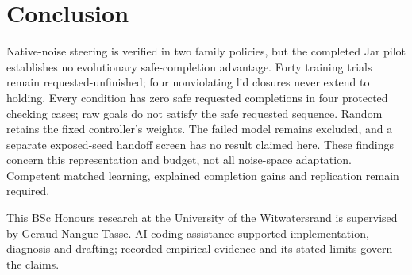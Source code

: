 \documentclass[sigconf,dvipsnames,balance=false]{acmart}
\begin{document}
\section{Conclusion}
Native-noise steering is verified in two family policies, but the completed
Jar pilot establishes no evolutionary safe-completion advantage. Forty training
trials remain requested-unfinished; four nonviolating lid closures never extend
to holding. Every condition has zero safe requested completions in four protected
checking cases; raw goals do not satisfy the safe requested sequence. Random
retains the fixed controller's weights. The failed model remains excluded, and
a separate exposed-seed handoff screen has no result claimed here. These findings
concern this representation and budget, not all noise-space adaptation. Competent
matched learning, explained completion gains and replication remain required.

\begin{acks}
This BSc Honours research at the University of the Witwatersrand is supervised by
Geraud Nangue Tasse. AI coding assistance supported implementation, diagnosis and
drafting; recorded empirical evidence and its stated limits govern the claims.
\end{acks}


\end{document}
